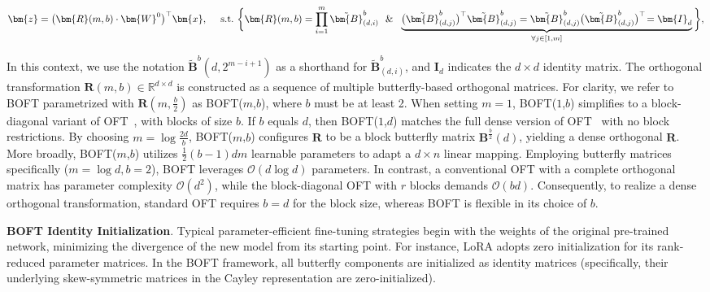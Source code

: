 \begin{equation}
    \begin{aligned}\nonumber
    \bm{z}=\big(\bm{R}(m,b)\cdot\bm{W}^0\big)^\top\bm{x},~~~~\text{s.t.}~\bigg{\{}\bm{R}(m,b)=\prod_{i=1}^m \tilde{\bm{B}}^b_{(d,i)}~~\&~~\underbrace{\big(\tilde{\bm{B}}^b_{(d,j)}\big)^\top\tilde{\bm{B}}^b_{(d,j)}=\tilde{\bm{B}}^b_{(d,j)}\big(\tilde{\bm{B}}^b_{(d,j)}\big)^\top\!=\bm{I}_d}_{\forall j\in [1, m]}\bigg{\}},
    \end{aligned}
\end{equation}

In this context, we use the notation $\tilde{\bm{B}}^b(d,2^{m - i+1})$ as a shorthand for $\tilde{\bm{B}}^b_{(d,i)}$, and $\bm{I}_d$ indicates the $d\times d$ identity matrix. The orthogonal transformation $\bm{R}(m,b)\in\mathbb{R}^{d\times d}$ is constructed as a sequence of multiple butterfly-based orthogonal matrices. For clarity, we refer to BOFT parametrized with $\bm{R}(m,\frac{b}{2})$ as BOFT($m$,$b$), where $b$ must be at least 2. When setting $m=1$, BOFT($1$,$b$) simplifies to a block-diagonal variant of OFT~\cite{qiu2023controlling}, with blocks of size $b$. If $b$ equals $d$, then BOFT($1$,$d$) matches the full dense version of OFT~\cite{qiu2023controlling} with no block restrictions. By choosing $m=\log \frac{2d}{b}$, BOFT($m$,$b$) configures $\bm{R}$ to be a block butterfly matrix $\bm{B}^{\frac{b}{2}}(d)$, yielding a dense orthogonal $\bm{R}$. More broadly, BOFT($m$,$b$) utilizes $\frac{1}{2}(b-1)dm$ learnable parameters to adapt a $d\times n$ linear mapping. Employing butterfly matrices specifically ($m=\log d, b=2$), BOFT leverages $\mathcal{O}(d\log d)$ parameters. In contrast, a conventional OFT with a complete orthogonal matrix has parameter complexity $\mathcal{O}(d^2)$, while the block-diagonal OFT with $r$ blocks demands $\mathcal{O}(bd)$. Consequently, to realize a dense orthogonal transformation, standard OFT requires $b=d$ for the block size, whereas BOFT is flexible in its choice of $b$.

\textbf{BOFT Identity Initialization}. Typical parameter-efficient fine-tuning strategies begin with the weights of the original pre-trained network, minimizing the divergence of the new model from its starting point. For instance, LoRA adopts zero initialization for its rank-reduced parameter matrices. In the BOFT framework, all butterfly components are initialized as identity matrices (specifically, their underlying skew-symmetric matrices in the Cayley representation are zero-initialized).

